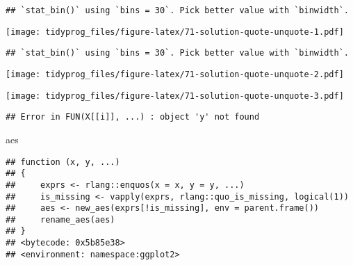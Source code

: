 \documentclass[]{book}
\newenvironment{Shaded}{\begin{snugshade}}{\end{snugshade}}
\newcommand{\KeywordTok}[1]{\textcolor[rgb]{0.13,0.29,0.53}{\textbf{#1}}}
\newcommand{\NormalTok}[1]{#1}
\newcommand{\OperatorTok}[1]{\textcolor[rgb]{0.81,0.36,0.00}{\textbf{#1}}}
\newcommand{\StringTok}[1]{\textcolor[rgb]{0.31,0.60,0.02}{#1}}
\begin{document}
\begin{verbatim}
## `stat_bin()` using `bins = 30`. Pick better value with `binwidth`.
\end{verbatim}

\texttt{[image: tidyprog\_files/figure-latex/71-solution-quote-unquote-1.pdf]}

\begin{Shaded}
\end{Shaded}

\begin{verbatim}
## `stat_bin()` using `bins = 30`. Pick better value with `binwidth`.
\end{verbatim}

\texttt{[image: tidyprog\_files/figure-latex/71-solution-quote-unquote-2.pdf]}

\begin{Shaded}
\end{Shaded}

\texttt{[image: tidyprog\_files/figure-latex/71-solution-quote-unquote-3.pdf]}

\begin{verbatim}
## Error in FUN(X[[i]], ...) : object 'y' not found
\end{verbatim}

\begin{Shaded}
\begin{Highlighting}[]
\NormalTok{aes}
\end{Highlighting}
\end{Shaded}

\begin{verbatim}
## function (x, y, ...) 
## {
##     exprs <- rlang::enquos(x = x, y = y, ...)
##     is_missing <- vapply(exprs, rlang::quo_is_missing, logical(1))
##     aes <- new_aes(exprs[!is_missing], env = parent.frame())
##     rename_aes(aes)
## }
## <bytecode: 0x5b85e38>
## <environment: namespace:ggplot2>
\end{verbatim}
\end{document}
